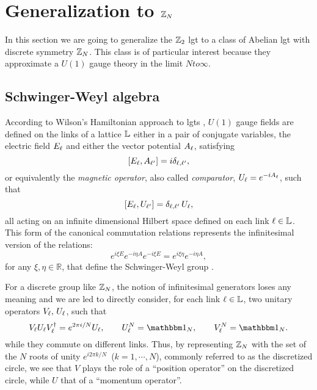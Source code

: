 \section{Generalization to \texorpdfstring{$\mathbb{Z}_N$}{Z\_N}}%
\label{sec:generalization_to_zn}
In this section we are going to generalize the $\mathbb{Z}_2$ \ac{lgt} to a class of Abelian \ac{lgt} with discrete symmetry $\mathbb{Z}_N$.
This class is of particular interest because they approximate a $U(1)$ gauge theory in the limit $N to \infty$.



%
%
\subsection{Schwinger-Weyl algebra}%
\label{sub:schwinger_weyl_algebra}

According to Wilson's Hamiltonian approach to \ac{lgt}s \cite{wilson1974confinement}, $U(1)$ gauge fields are defined on the links of a lattice $\mathbb{L}$ either in a pair of conjugate variables, the electric field  $E_\ell$ and either the vector potential $A_\ell$, satisfying
\begin{equation}
    \comm{E_\link}{A_{\link^{\prime}}}  = i \delta_{\link , \link^{\prime} },
\end{equation}
or equivalently the \emph{magnetic operator}, also called \emph{comparator},
$U_\ell = e^{-i A_{\ell} }$, such that
\begin{equation}
    \comm{E_\link}{U_{\link^{\prime}}} =  \delta_{\link , \link^{\prime} } \, U_{\link},
\end{equation}
all acting on an infinite dimensional Hilbert space defined on each link $\ell \in \mathbb{L}$.
This form of the canonical commutation relations represents the infinitesimal version of the relations:
\begin{equation}
     e^{i\xi E} e^{-i\eta A } e^{-i\xi E} = e^{i\xi \eta} e^ {-i\eta A },
\end{equation}
for any $\xi, \eta \in \mathbb{R}$,
that define the Schwinger-Weyl group \cite{notarnicola2015discrete, ercolessi2018znmodels, schwinger1960unitary}.

For a discrete group like $\mathbb{Z}_N$, the notion of infinitesimal generators loses any meaning and we are led to directly consider, for each link $\ell \in \mathbb{L}$, two unitary operators
$V_\ell, \, U_\ell$, such that \cite{schwinger1960unitary, schwinger2001symbolism}
\begin{equation}
    V_\link U_\link V_\link^{\dagger}=e^{2\pi i/N}U_\link, \qquad
    U_\link^N=\identity_N, \qquad
    V_\link^N=\identity_N.
    \label{eq:schwinger_weyl_algebra}
\end{equation}
while they commute on different links.
Thus, by representing $\mathbb{Z}_N$  with the set of the $N$ roots of unity $e^{i 2 \pi k/N}$\, ($k=1, \cdots, N$), commonly referred to as the discretized circle,
we see that $V$ plays the role of a ``position operator'' on the discretized circle, while $U$ that of a ``momentum operator''.


